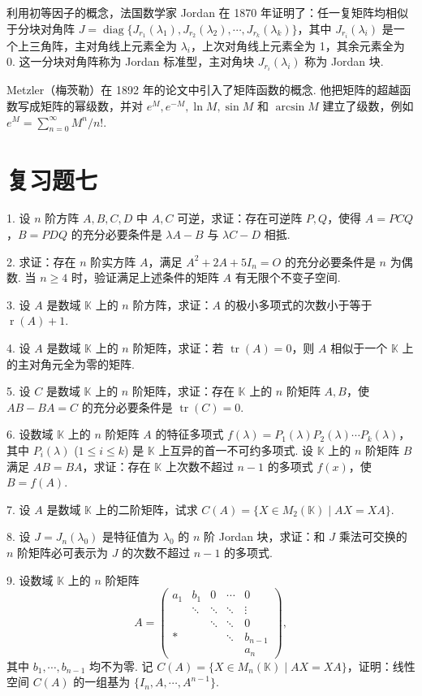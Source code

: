 \documentclass[UTF8,12pt,a4paper,fontset=fandol]{ctexart}
\begin{document}
利用初等因子的概念，法国数学家 Jordan 在 1870 年证明了：任一复矩阵均相似于分块对角阵 $J=\operatorname{diag}\{J_{r_1}(\lambda_1),J_{r_2}(\lambda_2),\cdots,J_{r_k}(\lambda_k)\}$，其中 $J_{r_i}(\lambda_i)$ 是一个上三角阵，主对角线上元素全为 $\lambda_i$，上次对角线上元素全为 1，其余元素全为 0. 这一分块对角阵称为 Jordan 标准型，主对角块 $J_{r_i}(\lambda_i)$ 称为 Jordan 块.

Metzler（梅茨勒）在 1892 年的论文中引入了矩阵函数的概念. 他把矩阵的超越函数写成矩阵的幂级数，并对 $e^M,e^{-M},\ln M,\sin M$ 和 $\arcsin M$ 建立了级数，例如 $e^M=\sum_{n=0}^{\infty}M^n/n!$.

\section*{复习题七}

1. 设 $n$ 阶方阵 $A,B,C,D$ 中 $A,C$ 可逆，求证：存在可逆阵 $P,Q$，使得 $A=PCQ$，$B=PDQ$ 的充分必要条件是 $\lambda A-B$ 与 $\lambda C-D$ 相抵.

2. 求证：存在 $n$ 阶实方阵 $A$，满足 $A^2+2A+5I_n=O$ 的充分必要条件是 $n$ 为偶数. 当 $n\geq 4$ 时，验证满足上述条件的矩阵 $A$ 有无限个不变子空间.

3. 设 $A$ 是数域 $\mathbb K$ 上的 $n$ 阶方阵，求证：$A$ 的极小多项式的次数小于等于 $\operatorname{r}(A)+1$.

4. 设 $A$ 是数域 $\mathbb K$ 上的 $n$ 阶矩阵，求证：若 $\operatorname{tr}(A)=0$，则 $A$ 相似于一个 $\mathbb K$ 上的主对角元全为零的矩阵.

5. 设 $C$ 是数域 $\mathbb K$ 上的 $n$ 阶矩阵，求证：存在 $\mathbb K$ 上的 $n$ 阶矩阵 $A,B$，使 $AB-BA=C$ 的充分必要条件是 $\operatorname{tr}(C)=0$.

6. 设数域 $\mathbb K$ 上的 $n$ 阶矩阵 $A$ 的特征多项式 $f(\lambda)=P_1(\lambda)P_2(\lambda)\cdots P_k(\lambda)$，其中 $P_i(\lambda)$ ($1\leq i\leq k$) 是 $\mathbb K$ 上互异的首一不可约多项式. 设 $\mathbb K$ 上的 $n$ 阶矩阵 $B$ 满足 $AB=BA$，求证：存在 $\mathbb K$ 上次数不超过 $n-1$ 的多项式 $f(x)$，使 $B=f(A)$.

7. 设 $A$ 是数域 $\mathbb K$ 上的二阶矩阵，试求 $C(A)=\{X\in M_2(\mathbb K)\mid AX=XA\}$.

8. 设 $J=J_n(\lambda_0)$ 是特征值为 $\lambda_0$ 的 $n$ 阶 Jordan 块，求证：和 $J$ 乘法可交换的 $n$ 阶矩阵必可表示为 $J$ 的次数不超过 $n-1$ 的多项式.

9. 设数域 $\mathbb K$ 上的 $n$ 阶矩阵
\[
A=\left(\begin{array}{ccccc}
a_1 & b_1 & 0 & \cdots & 0\\
& \ddots & \ddots & \ddots & \vdots\\
& & \ddots & \ddots & 0\\
* & & & \ddots & b_{n-1}\\
& & & & a_n
\end{array}\right),
\]
其中 $b_1,\cdots,b_{n-1}$ 均不为零. 记 $C(A)=\{X\in M_n(\mathbb K)\mid AX=XA\}$，证明：线性空间 $C(A)$ 的一组基为 $\{I_n,A,\cdots,A^{n-1}\}$.
\end{document}
